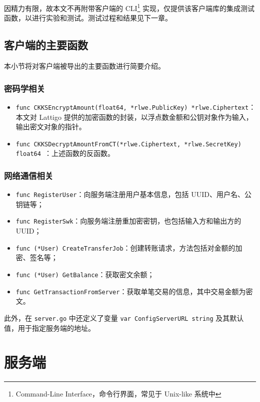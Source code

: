 因精力有限，故本文不再附带客户端的 CLI\footnote{Command-Line Interface，命令行界面，常见于 Unix-like 系统中} 实现，仅提供该客户端库的集成测试函数，以进行实验和测试。测试过程和结果见下一章。

\subsection{客户端的主要函数}

本小节将对客户端被导出的主要函数进行简要介绍。

\subsubsection{密码学相关}

\begin{itemize}
    \item \verb|func CKKSEncryptAmount(float64, *rlwe.PublicKey) *rlwe.Ciphertext|：本文对 Lattigo 提供的加密函数的封装，以浮点数金额和公钥对象作为输入，输出密文对象的指针。
    \item \verb|func CKKSDecryptAmountFromCT(*rlwe.Ciphertext, *rlwe.SecretKey) float64 |：上述函数的反函数。
\end{itemize}

\subsubsection{网络通信相关}

\begin{itemize}
    \item \verb|func RegisterUser|：向服务端注册用户基本信息，包括 UUID、用户名、公钥链等；
    \item \verb|func RegisterSwk|：向服务端注册重加密密钥，也包括输入方和输出方的 UUID；
    \item \verb|func (*User) CreateTransferJob|：创建转账请求，方法包括对金额的加密、签名等；
    \item \verb|func (*User) GetBalance|：获取密文余额；
    \item \verb|func GetTransactionFromServer|：获取单笔交易的信息，其中交易金额为密文。
\end{itemize}

此外，在 \verb|server.go| 中还定义了变量 \verb|var ConfigServerURL string| 及其默认值，用于指定服务端的地址。

\section{服务端}

